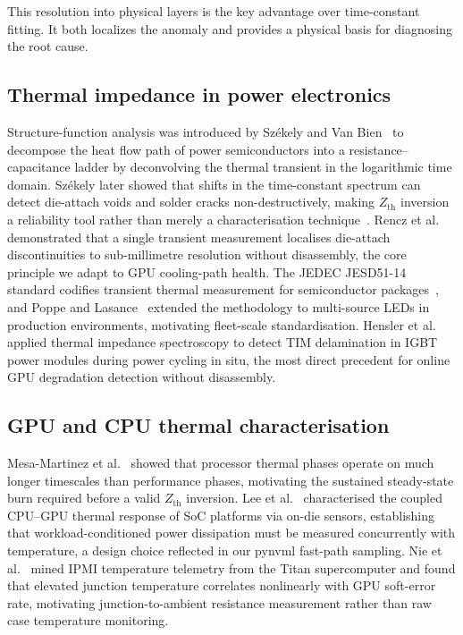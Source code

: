 \documentclass[conference]{IEEEtran}
\begin{document}
This resolution into physical layers is the key advantage over
time-constant fitting. It both localizes the anomaly and provides
a physical basis for diagnosing the root cause.

\subsection{Thermal impedance in power electronics}

Structure-function analysis was introduced by Sz\'ekely and Van
Bien~\cite{szekely1988} to decompose the heat flow path of power
semiconductors into a resistance--capacitance ladder by deconvolving
the thermal transient in the logarithmic time domain.
Sz\'ekely later showed that shifts in the time-constant spectrum can
detect die-attach voids and solder cracks non-destructively, making
$Z_\text{th}$ inversion a reliability tool rather than merely a
characterisation technique~\cite{szekely2002}.
Rencz et al.~\cite{rencz2002} demonstrated that a single transient
measurement localises die-attach discontinuities to sub-millimetre
resolution without disassembly, the core principle we adapt to
GPU cooling-path health.
The JEDEC JESD51-14 standard codifies transient thermal measurement
for semiconductor packages~\cite{jedec2010}, and Poppe and
Lasance~\cite{poppe2009} extended the methodology to multi-source
LEDs in production environments, motivating fleet-scale standardisation.
Hensler et al.~\cite{hensler2011} applied thermal impedance
spectroscopy to detect TIM delamination in IGBT power modules during
power cycling in situ, the most direct precedent for online GPU
degradation detection without disassembly.

\subsection{GPU and CPU thermal characterisation}

Mesa-Martinez et al.~\cite{mesam2010} showed that processor thermal
phases operate on much longer timescales than performance phases,
motivating the sustained steady-state burn required before a valid
$Z_\text{th}$ inversion.
Lee et al.~\cite{lee2019} characterised the coupled CPU--GPU thermal
response of SoC platforms via on-die sensors, establishing that
workload-conditioned power dissipation must be measured concurrently
with temperature, a design choice reflected in our pynvml fast-path
sampling.
Nie et al.~\cite{nie2017} mined IPMI temperature telemetry from
the Titan supercomputer and found that elevated junction temperature
correlates nonlinearly with GPU soft-error rate, motivating
junction-to-ambient resistance measurement rather than raw case
temperature monitoring.
\end{document}
